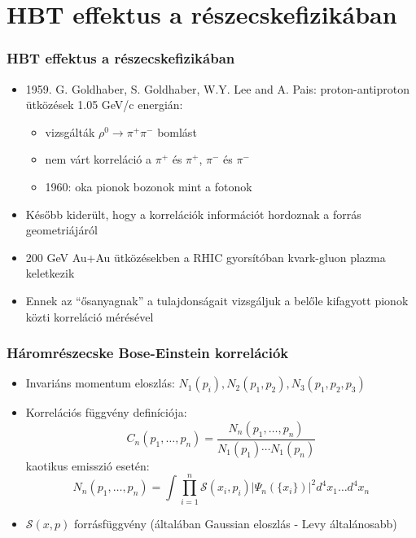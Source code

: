 \documentclass{beamer}
\begin{document}
\section{HBT effektus a részecskefizikában}
\begin{frame}
\frametitle{HBT effektus a részecskefizikában}
\begin{itemize}
\setlength{\itemsep}{14pt}
\item  1959. G. Goldhaber, S. Goldhaber, W.Y. Lee and A. Pais:
proton-antiproton ütközések 1.05 GeV/c energián:\vspace*{0.2cm}
\begin{itemize}
\setlength{\itemsep}{10pt}
\item vizsgálták $\rho^0\rightarrow \pi^+\pi^-$ bomlást
\item nem várt korreláció a $\pi^+$ és $\pi^+$, $\pi^-$ és $\pi^-$
\item 1960: oka pionok bozonok mint a fotonok
\end{itemize}
\item Később kiderült, hogy a korrelációk információt hordoznak a forrás geometriájáról
\item 200 GeV Au+Au ütközésekben a RHIC gyorsítóban kvark-gluon plazma keletkezik
\item Ennek az ``ősanyagnak'' a tulajdonságait vizsgáljuk a belőle kifagyott pionok közti korreláció mérésével
\end{itemize}
\end{frame}

\begin{frame}
\frametitle{Háromrészecske Bose-Einstein korrelációk }
\begin{itemize}
\setlength{\itemsep}{8pt}
\item Invariáns momentum eloszlás: $N_1(p_i), N_2(p_1,p_2),N_3(p_1, p_2, p_3)$
\item Korrelációs függvény definíciója:
\begin{equation*}
C_n(p_1,\dots,p_n)=\frac{N_n(p_1,\dots,p_n)}{N_1(p_1)\cdots N_1(p_n)}
\end{equation*}
 kaotikus emisszió esetén:
\begin{equation*}
N_n(p_1,\dots,p_n)=\int \prod_{i=1}^{n}\mathcal{S}(x_i,p_i)|\Psi_{n}(\{x_i\})|^2 d^4x_1\dots d^4x_n
\end{equation*}
\item $\mathcal{S}(x,p)$ forrásfüggvény (általában Gaussian eloszlás - Levy általánosabb)
\end{itemize}
\end{frame}
\end{document}
